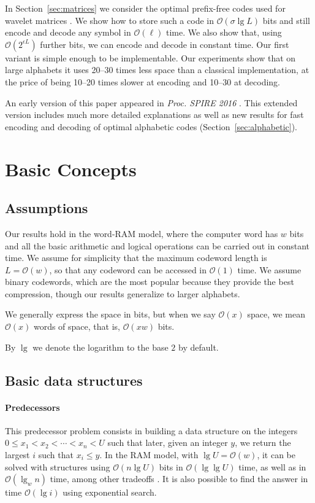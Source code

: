 \documentclass[preprint,12pt]{elsarticle}
\newcommand{\Oh}[1]{\ensuremath{\mathcal{O}\!\left({#1}\right)}}
\renewcommand{\log}{\lg}
\begin{document}
In Section~\ref{sec:matrices} we consider the optimal prefix-free codes used
for wavelet matrices \cite{CNO15}. We show how to store such a code in 
$\Oh{\sigma \log L}$ bits and still encode and decode any symbol in 
$\Oh{\ell}$ time. We also show that, using $\Oh{2^{\epsilon L}}$ further bits, 
we can encode and decode in constant time.
Our first variant is simple enough to be implementable. Our
experiments show that on large alphabets it uses 20--30 times less space 
than a classical implementation, at the price of being 10--20 times slower at 
encoding and 10--30 at decoding.

An early version of this paper appeared in {\em Proc. SPIRE 2016} 
\cite{SPIRE16}. This extended version includes much more detailed 
explanations as well as new results for fast encoding and decoding of
optimal alphabetic codes (Section~\ref{sec:alphabetic}).

\section{Basic Concepts}

\subsection{Assumptions}
\label{sec:assumptions}

Our results hold in the word-RAM model, where the computer word has $w$ bits 
and all the basic arithmetic and logical operations can be carried out in 
constant time. We assume for simplicity that the maximum codeword length is 
$L = \Oh{w}$, so that any codeword can be accessed in $\Oh{1}$ time. We assume 
binary codewords, which are the most popular because they provide the best 
compression, though our results generalize to larger alphabets.

We generally express the space in bits, but when we say $\Oh{x}$ space, we
mean $\Oh{x}$ words of space, that is, $\Oh{xw}$ bits. 

By $\lg$ we denote the logarithm to the base $2$ by default.

\subsection{Basic data structures}
\label{sec:basics}

\paragraph{Predecessors}
This predecessor problem consists in building a data structure on the integers
$0 \le x_1 < x_2 < \cdots < x_n < U$ such that later, given an integer $y$,
we return the largest $i$ such that $x_i \le y$. In the RAM model, with
$\log U = \Oh{w}$, it can be 
solved with structures using $\Oh{n\log U}$ bits in $\Oh{\log\log U}$ time, as 
well as in $\Oh{\log_w n}$ time, among other tradeoffs \cite{PT06}. It is 
also possible to find the answer in time $\Oh{\log i}$ using exponential 
search.
\end{document}
